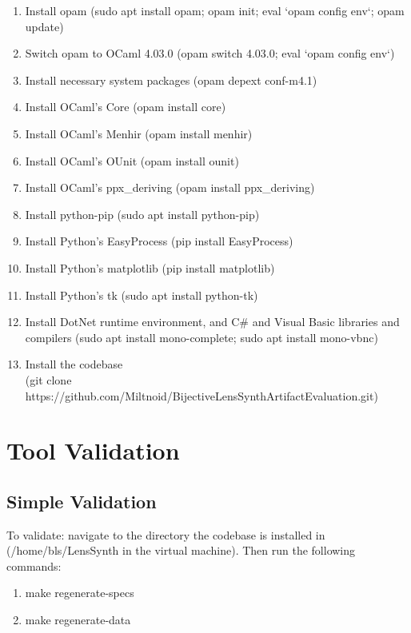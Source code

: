 \documentclass[sigplan,acmsmall]{acmart}
\begin{document}
\begin{enumerate}
\item Install opam (sudo apt install opam; opam init; eval `opam config env`;
  opam update)
\item Switch opam to OCaml 4.03.0 (opam switch 4.03.0; eval `opam config env`)
\item Install necessary system packages (opam depext conf-m4.1)
\item Install OCaml's Core (opam install core)
\item Install OCaml's Menhir (opam install menhir)
\item Install OCaml's OUnit (opam install ounit)
\item Install OCaml's ppx\_deriving (opam install ppx\_deriving)
  
\item Install python-pip (sudo apt install python-pip)
\item Install Python's EasyProcess (pip install EasyProcess)
\item Install Python's matplotlib (pip install matplotlib)
\item Install Python's tk (sudo apt install python-tk)
  
\item Install DotNet runtime environment, and C\# and Visual Basic libraries and
  compilers (sudo apt install mono-complete; sudo apt install mono-vbnc)

\item Install the codebase\\
  (git clone https://github.com/Miltnoid/BijectiveLensSynthArtifactEvaluation.git)
\end{enumerate}


\section{Tool Validation}

\subsection{Simple Validation}

To validate: navigate to the directory the codebase is installed in
(/home/bls/LensSynth in the virtual machine).
Then run the following commands:
\begin{enumerate}
\item make regenerate-specs
\item make regenerate-data
\end{enumerate}
\end{document}
